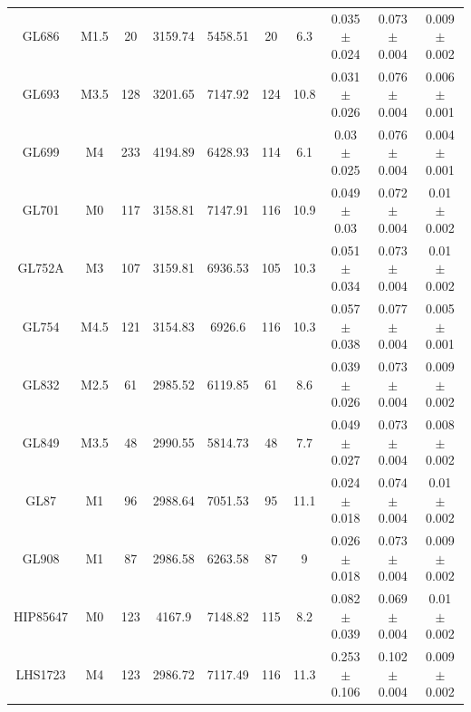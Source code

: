 \begin{landscape}
\begin{longtable}{|c|c|c|c|c|c|c|c|c|c|}
GL686 & M1.5 & 20 & 3159.74 & 5458.51 & 20 & 6.3 & 0.035 $\pm$ 0.024 & 0.073 $\pm$ 0.004 & 0.009 $\pm$ 0.002\\    
GL693 & M3.5 & 128 & 3201.65 & 7147.92 & 124 & 10.8 & 0.031 $\pm$ 0.026 & 0.076 $\pm$ 0.004 & 0.006 $\pm$ 0.001\\ 
GL699 & M4 & 233 & 4194.89 & 6428.93 & 114 & 6.1 & 0.03 $\pm$ 0.025 & 0.076 $\pm$ 0.004 & 0.004 $\pm$ 0.001\\     
GL701 & M0 & 117 & 3158.81 & 7147.91 & 116 & 10.9 & 0.049 $\pm$ 0.03 & 0.072 $\pm$ 0.004 & 0.01 $\pm$ 0.002\\     
GL752A & M3 & 107 & 3159.81 & 6936.53 & 105 & 10.3 & 0.051 $\pm$ 0.034 & 0.073 $\pm$ 0.004 & 0.01 $\pm$ 0.002\\   
GL754 & M4.5 & 121 & 3154.83 & 6926.6 & 116 & 10.3 & 0.057 $\pm$ 0.038 & 0.077 $\pm$ 0.004 & 0.005 $\pm$ 0.001\\  
GL832 & M2.5 & 61 & 2985.52 & 6119.85 & 61 & 8.6 & 0.039 $\pm$ 0.026 & 0.073 $\pm$ 0.004 & 0.009 $\pm$ 0.002\\    
GL849 & M3.5 & 48 & 2990.55 & 5814.73 & 48 & 7.7 & 0.049 $\pm$ 0.027 & 0.073 $\pm$ 0.004 & 0.008 $\pm$ 0.002\\    
GL87 & M1 & 96 & 2988.64 & 7051.53 & 95 & 11.1 & 0.024 $\pm$ 0.018 & 0.074 $\pm$ 0.004 & 0.01 $\pm$ 0.002\\
GL908 & M1 & 87 & 2986.58 & 6263.58 & 87 & 9 & 0.026 $\pm$ 0.018 & 0.073 $\pm$ 0.004 & 0.009 $\pm$ 0.002\\
HIP85647 & M0 & 123 & 4167.9 & 7148.82 & 115 & 8.2 & 0.082 $\pm$ 0.039 & 0.069 $\pm$ 0.004 & 0.01 $\pm$ 0.002\\   
LHS1723 & M4 & 123 & 2986.72 & 7117.49 & 116 & 11.3 & 0.253 $\pm$ 0.106 & 0.102 $\pm$ 0.004 & 0.009 $\pm$ 0.002
    \label{tabHARPSactive}
    \end{longtable}
\end{landscape}

